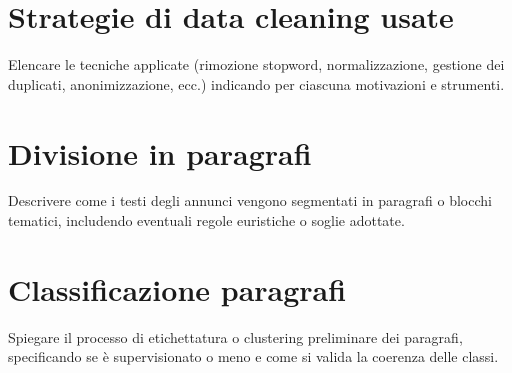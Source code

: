 \section{Strategie di data cleaning usate}
Elencare le tecniche applicate (rimozione stopword, normalizzazione, gestione dei duplicati, anonimizzazione, ecc.) indicando per ciascuna motivazioni e strumenti.

\section{Divisione in paragrafi}
Descrivere come i testi degli annunci vengono segmentati in paragrafi o blocchi tematici, includendo eventuali regole euristiche o soglie adottate.

\section{Classificazione paragrafi}
Spiegare il processo di etichettatura o clustering preliminare dei paragrafi, specificando se è supervisionato o meno e come si valida la coerenza delle classi.
